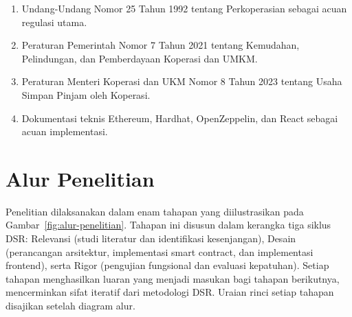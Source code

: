 \begin{enumerate}
	\item Undang-Undang Nomor 25 Tahun 1992 tentang Perkoperasian sebagai acuan regulasi utama.
	\item Peraturan Pemerintah Nomor 7 Tahun 2021 tentang Kemudahan, Pelindungan, dan Pemberdayaan Koperasi dan UMKM.
	\item Peraturan Menteri Koperasi dan UKM Nomor 8 Tahun 2023 tentang Usaha Simpan Pinjam oleh Koperasi.
	\item Dokumentasi teknis Ethereum, Hardhat, OpenZeppelin, dan React sebagai acuan implementasi.
\end{enumerate}

\section{Alur Penelitian}

Penelitian dilaksanakan dalam enam tahapan yang diilustrasikan pada Gambar~\ref{fig:alur-penelitian}. Tahapan ini disusun dalam kerangka tiga siklus DSR: Relevansi (studi literatur dan identifikasi kesenjangan), Desain (perancangan arsitektur, implementasi smart contract, dan implementasi frontend), serta Rigor (pengujian fungsional dan evaluasi kepatuhan). Setiap tahapan menghasilkan luaran yang menjadi masukan bagi tahapan berikutnya, mencerminkan sifat iteratif dari metodologi DSR. Uraian rinci setiap tahapan disajikan setelah diagram alur.

